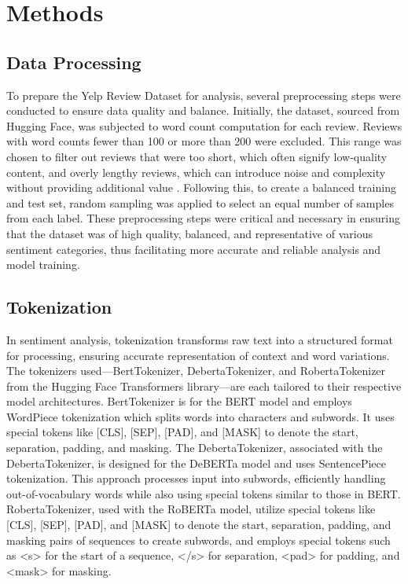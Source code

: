 \documentclass[12pt]{article}
\begin{document}
\section{Methods}

\subsection{Data Processing}
To prepare the Yelp Review Dataset for analysis, several preprocessing steps were conducted to ensure data quality and balance. Initially, the dataset, sourced from Hugging Face, was subjected to word count computation for each review. Reviews with word counts fewer than 100 or more than 200 were excluded. This range was chosen to filter out reviews that were too short, which often signify low-quality content, and overly lengthy reviews, which can introduce noise and complexity without providing additional value \citep{pang2008sentiment}. Following this, to create a balanced training and test set, random sampling was applied to select an equal number of samples from each label. These preprocessing steps were critical and necessary in ensuring that the dataset was of high quality, balanced, and representative of various sentiment categories, thus facilitating more accurate and reliable analysis and model training.

\subsection{Tokenization}
In sentiment analysis, tokenization transforms raw text into a structured format for processing, ensuring accurate representation of context and word variations. The tokenizers used—BertTokenizer, DebertaTokenizer, and RobertaTokenizer from the Hugging Face Transformers library—are each tailored to their respective model architectures. BertTokenizer is for the BERT model and employs WordPiece tokenization which splits words into characters and subwords. It uses special tokens like [CLS], [SEP], [PAD], and [MASK] to denote the start, separation, padding, and masking. The DebertaTokenizer, associated with the DebertaTokenizer, is designed for the DeBERTa model and uses SentencePiece tokenization. This approach processes input into subwords, efficiently handling out-of-vocabulary words while also using special tokens similar to those in BERT. RobertaTokenizer, used with the RoBERTa model, utilize special tokens like [CLS], [SEP], [PAD], and [MASK] to denote the start, separation, padding, and masking pairs of sequences to create subwords, and employs special tokens such as <s> for the start of a sequence, </s> for separation, <pad> for padding, and <mask> for masking. 
\end{document}
